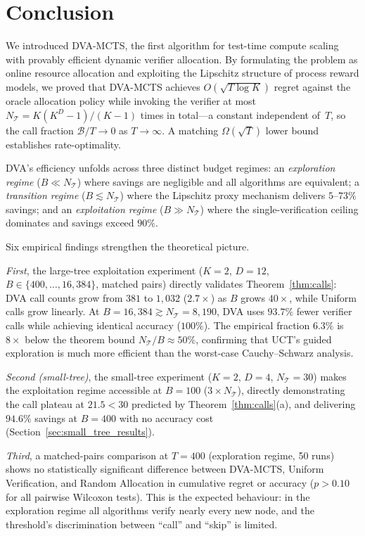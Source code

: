 \section{Conclusion}
\label{sec:conclusion}

We introduced DVA-MCTS, the first algorithm for test-time compute scaling with
provably efficient dynamic verifier allocation. By formulating the problem as online
resource allocation and exploiting the Lipschitz structure of process reward models,
we proved that DVA-MCTS achieves $O(\sqrt{T\log K})$ regret against the oracle
allocation policy while invoking the verifier at most $N_{\mathcal{T}} = K(K^D-1)/(K-1)$
times in total---a constant independent of~$T$, so the call fraction
$\mathcal{B}/T \to 0$ as $T \to \infty$. A matching $\Omega(\sqrt{T})$ lower
bound establishes rate-optimality.

DVA's efficiency unfolds across three distinct budget regimes: an
\emph{exploration regime} ($B \ll N_{\mathcal{T}}$) where savings are negligible
and all algorithms are equivalent; a \emph{transition regime} ($B \lesssim N_{\mathcal{T}}$)
where the Lipschitz proxy mechanism delivers $5$--$73\%$ savings; and an
\emph{exploitation regime} ($B \gg N_{\mathcal{T}}$) where the single-verification
ceiling dominates and savings exceed $90\%$.

Six empirical findings strengthen the theoretical picture.

\emph{First}, the large-tree exploitation experiment ($K{=}2$, $D{=}12$,
$B \in \{400,\ldots,16{,}384\}$, matched pairs) directly validates
Theorem~\ref{thm:calls}: DVA call counts grow from $381$ to $1{,}032$ ($2.7\times$)
as $B$ grows $40\times$, while Uniform calls grow linearly.
At $B{=}16{,}384 \gtrsim N_{\mathcal{T}}{=}8{,}190$, DVA uses $\mathbf{93.7\%}$
fewer verifier calls while achieving identical accuracy ($100\%$). The empirical
fraction $6.3\%$ is $8\times$ below the theorem bound $N_{\mathcal{T}}/B \approx 50\%$,
confirming that UCT's guided exploration is much more efficient than the worst-case
Cauchy--Schwarz analysis.

\emph{Second (small-tree)}, the small-tree experiment ($K{=}2$, $D{=}4$,
$N_{\mathcal{T}}{=}30$) makes the exploitation regime accessible at $B{=}100$
($3\times N_{\mathcal{T}}$), directly demonstrating the call plateau at $21.5 < 30$
predicted by Theorem~\ref{thm:calls}(a), and delivering $\mathbf{94.6\%}$ savings
at $B{=}400$ with no accuracy cost (Section~\ref{sec:small_tree_results}).

\emph{Third}, a matched-pairs comparison at $T{=}400$ (exploration regime,
50 runs) shows no statistically significant difference between DVA-MCTS, Uniform
Verification, and Random Allocation in cumulative regret or accuracy ($p > 0.10$
for all pairwise Wilcoxon tests). This is the expected behaviour: in the
exploration regime all algorithms verify nearly every new node, and the threshold's
discrimination between ``call'' and ``skip'' is limited.

